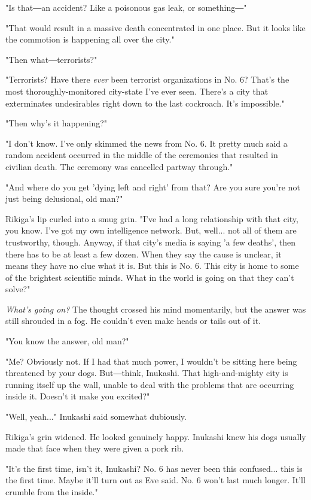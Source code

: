 "Is that―an accident? Like a poisonous gas leak, or something―"

"That would result in a massive death concentrated in one place. But it
looks like the commotion is happening all over the city."

"Then what―terrorists?"

"Terrorists? Have there \emph{ever} been terrorist organizations in No. 6?
That's the most thoroughly-monitored city-state I've ever seen. There's
a city that exterminates undesirables right down to the last cockroach.
It's impossible."

"Then why's it happening?"

"I don't know. I've only skimmed the news from No. 6. It pretty much
said a random accident occurred in the middle of the ceremonies that
resulted in civilian death. The ceremony was cancelled partway through."

"And where do you get 'dying left and right' from that? Are you sure
you're not just being delusional, old man?"

Rikiga's lip curled into a smug grin. "I've had a long relationship with
that city, you know. I've got my own intelligence network. But, well...
not all of them are trustworthy, though. Anyway, if that city's media is
saying 'a few deaths', then there has to be at least a few dozen. When
they say the cause is unclear, it means they have no clue what it is.
But this is No. 6. This city is home to some of the brightest scientific
minds. What in the world is going on that they can't solve?"

\emph{What's going on?} The thought crossed his mind momentarily, but the
answer was still shrouded in a fog. He couldn't even make heads or tails
out of it.

"You know the answer, old man?"

"Me? Obviously not. If I had that much power, I wouldn't be sitting here
being threatened by your dogs. But―think, Inukashi. That high-and-mighty
city is running itself up the wall, unable to deal with the problems
that are occurring inside it. Doesn't it make you excited?"

"Well, yeah..." Inukashi said somewhat dubiously.

Rikiga's grin widened. He looked genuinely happy. Inukashi knew his dogs
usually made that face when they were given a pork rib.

"It's the first time, isn't it, Inukashi? No. 6 has never been this
confused... this is the first time. Maybe it'll turn out as Eve said.
No. 6 won't last much longer. It'll crumble from the inside."

